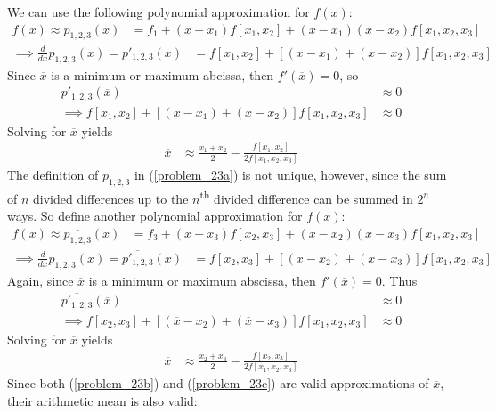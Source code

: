 \documentclass[12pt]{article}
\begin{document}
\noindent We can use the following polynomial approximation for $f(x)$:
\begin{align}
\label{problem_23a}
f(x) \approx p_{1, 2, 3}(x) &= f_1 + (x - x_1)f[x_1, x_2] + (x - x_1)(x - x_2)f[x_1, x_2, x_3] 
\end{align}
\begin{align*}
\implies \frac{d}{dx}p_{1, 2, 3}(x) = p'_{1, 2, 3}(x) &= f[x_1, x_2] + [(x - x_1) + (x - x_2)]f[x_1, x_2, x_3]
\end{align*}
Since $\overline{x}$ is a minimum or maximum abcissa, then $f'(\overline{x}) = 0$, so
\begin{align*}
p'_{1, 2, 3}(\overline{x}) &\approx 0 \\
\implies f[x_1, x_2] + [(\overline{x} - x_1) + (\overline{x} - x_2)]f[x_1, x_2, x_3] &\approx 0
\end{align*}
Solving for $\overline{x}$ yields
\begin{align}
\label{problem_23b}
\overline{x} &\approx \boxed{\frac{x_1 + x_2}{2} - \frac{f[x_1, x_2]}{2f[x_1, x_2, x_3]}}
\end{align}
The definition of $p_{1, 2, 3}$ in (\ref{problem_23a}) is not unique, however, since the sum of $n$ divided differences up to the $n$\textsuperscript{th} divided difference can be summed in $2^n$ ways.  So define another polynomial approximation for $f(x)$:
\begin{align*}
f(x) \approx \overline{p_{1, 2, 3}}(x) &= f_3 + (x - x_3)f[x_2, x_3] + (x - x_2)(x - x_3)f[x_1, x_2, x_3]
\end{align*}
\begin{align*}
\implies \frac{d}{dx}\overline{p_{1, 2, 3}}(x) = \overline{p'_{1, 2, 3}}(x) &= f[x_2, x_3] + [(x - x_2) + (x - x_3)]f[x_1, x_2, x_3]
\end{align*}
Again, since $\overline{x}$ is a minimum or maximum abscissa, then $f'(\overline{x}) = 0$.  Thus
\begin{align*}
\overline{p'_{1, 2, 3}}(\overline{x}) &\approx 0 \\
\implies f[x_2, x_3] + [(\overline{x} - x_2) + (\overline{x} - x_3)]f[x_1, x_2, x_3] &\approx 0
\end{align*}
Solving for $\overline{x}$ yields
\begin{align}
\label{problem_23c}
\overline{x} &\approx \frac{x_2 + x_3}{2} - \frac{f[x_2, x_3]}{2f[x_1, x_2, x_3]}
\end{align}
Since both (\ref{problem_23b}) and (\ref{problem_23c}) are valid approximations of $\overline{x}$, their arithmetic mean is also valid:
\end{document}
